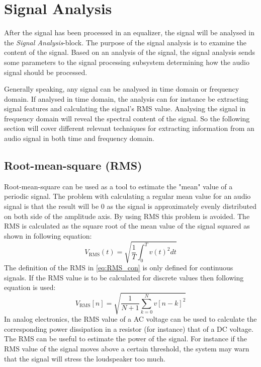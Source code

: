 \section{Signal Analysis}

After the signal has been processed in an equalizer, the signal will be analysed in the \textit{Signal Analysis}-block. The purpose of the signal analysis is to examine the content of the signal. Based on an analysis of the signal, the signal analysis sends some parameters to the signal processing subsystem determining how the audio signal should be processed. 

Generally speaking, any signal can be analysed in time domain or frequency domain. If analysed in time domain, the analysis can for instance be extracting signal features and calculating the signal's RMS value. Analysing the signal in frequency domain will reveal the spectral content of the signal. So the following section will cover different relevant techniques for extracting information from an audio signal in both time and frequency domain.

\subsection*{Root-mean-square (RMS)}
Root-mean-square can be used as a tool to estimate the "mean" value of a periodic signal. The problem with calculating a regular mean value for an audio signal is that the result will be 0 as the signal is approximately evenly distributed on both side of the amplitude axis. By using RMS this problem is avoided. The RMS is calculated as the square root of the mean value of the signal squared as shown in following equation:
\begin{equation}\label{eq:RMS_con}
V_{\text{RMS}}(t) = \sqrt{\frac{1}{T}\int_0^T v(t)^2 dt}
\end{equation}
The definition of the RMS in \autoref{eq:RMS_con} is only defined for continuous signals. If the RMS value is to be calculated for discrete values then following equation is used:
\begin{equation}
V_{\text{RMS}}[n] = \sqrt{\frac{1}{N+1}\sum_{k=0}^{N} v[n-k]^2}
\end{equation}
In analog electronics, the RMS value of a AC voltage can be used to calculate the corresponding power dissipation in a resistor (for instance) that of a DC voltage. The RMS can be useful to estimate the power of the signal. For instance if the RMS value of the signal moves above a certain threshold, the system may warn that the signal will stress the loudspeaker too much.

